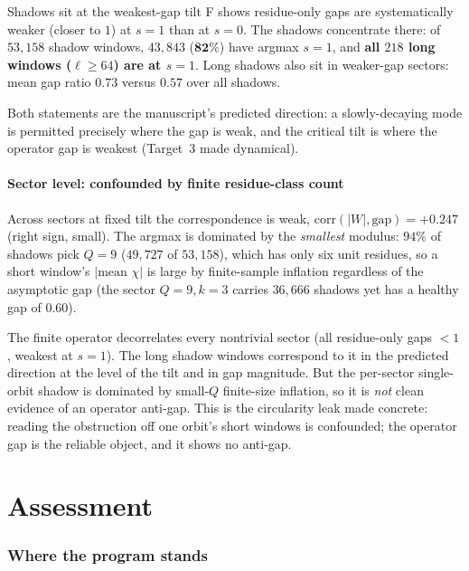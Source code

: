 \documentclass[11pt]{article}
\theoremstyle{plain}
\theoremstyle{remark}
\begin{document}
\begin{findingbox}{Shadows sit at the weakest-gap tilt}
F shows residue-only gaps are systematically weaker (closer to $1$) at $s{=}1$ than
at $s{=}0$. The shadows concentrate there: of $53{,}158$ shadow windows,
$43{,}843$ ($\mathbf{82\%}$) have argmax $s{=}1$, and \textbf{all $218$ long
windows ($\ell\ge64$) are at $s{=}1$}. Long shadows also sit in weaker-gap
sectors: mean gap ratio $\mathbf{0.73}$ versus $0.57$ over all shadows.
\end{findingbox}
\noindent Both statements are the manuscript's predicted direction: a
slowly-decaying mode is permitted precisely where the gap is weak, and the
critical tilt is where the operator gap is weakest (Target~3 made dynamical).

\subsection*{Sector level: confounded by finite residue-class count}

Across sectors at fixed tilt the correspondence is weak,
$\mathrm{corr}(\lvert W\rvert,\text{gap})=+0.247$ (right sign, small). The argmax is
dominated by the \emph{smallest} modulus: $94\%$ of shadows pick $Q=9$
($49{,}727$ of $53{,}158$), which has only six unit residues, so a short window's
$\lvert\text{mean }\chi\rvert$ is large by finite-sample inflation regardless of
the asymptotic gap (the sector $Q{=}9,k{=}3$ carries $36{,}666$ shadows yet has a
healthy gap of $0.60$).

\begin{keystatement}
The finite operator decorrelates every nontrivial sector (all residue-only gaps
$<1$, weakest at $s=1$). The long shadow windows correspond to it in the predicted
direction at the level of the tilt and in gap magnitude. But the per-sector
single-orbit shadow is dominated by small-$Q$ finite-size inflation, so it is
\emph{not} clean evidence of an operator anti-gap. This is the circularity leak
made concrete: reading the obstruction off one orbit's short windows is confounded;
the operator gap is the reliable object, and it shows no anti-gap.
\end{keystatement}

\part{Assessment}

\section*{Where the program stands}
\end{document}

